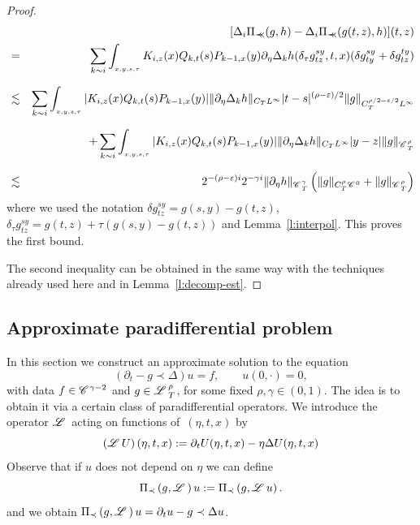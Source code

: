 \documentclass[11pt,reqno]{amsart}
\newcommand{\assign}{:=}
\newcommand{\precprec}{\prec\!\!\!\prec}
\newcommand{\CC}{\mathscr{C} \hspace{.1em}}
\newcommand{\LL}{\mathscr{L} \hspace{.2em}}
\begin{document}
\begin{proof}
  
  \begin{eqnarray*}
    &  & [\Delta_i \Pi_{\precprec} (g, h) - \Delta_i \Pi_{\precprec} (g (t,
    z), h)] (t, z)\\
    & = & \sum_{\underset{}{k \sim i}} \int_{_{x, y, s, \tau}} K_{i, z} (x)
    Q_{k, t} (s) P_{k - 1, x} (y) \partial_{\eta} \Delta_k h (\delta_{\tau}
    g^{s y}_{t z}, t, x) (\delta g^{s y}_{t y} + \delta g^{t y}_{t z})\\
    & \lesssim & \sum_{\underset{}{k \sim i}} \int_{_{x, y, s, \tau}} | K_{i,
    z} (x) Q_{k, t} (s) P_{k - 1, x} (y) | \| \partial_{\eta} \Delta_k h
    \|_{C_T L^{\infty}} | t - s |^{(\rho - \varepsilon) / 2} \| g \|_{C^{\rho
    / 2 - \varepsilon / 2}_T L^{\infty}}\\
    &  & + \sum_{\underset{}{k \sim i}} \int_{_{x, y, s, \tau}} | K_{i, z}
    (x) Q_{k, t} (s) P_{k - 1, x} (y) | \| \partial_{\eta} \Delta_k h \|_{C_T
    L^{\infty}} | y - z | \| g \|_{\CC^{\rho}_T}\\
    & \lesssim & 2^{- (\rho - \varepsilon) i} 2^{- \gamma i} \|
    \partial_{\eta} h \|_{\CC^{\gamma}_T} \left( \| g \|_{C^{\rho}_T \CC^0} +
    \| g \|_{\CC^{\rho}_T} \right)
  \end{eqnarray*}
  where we used the notation $\delta g^{s y}_{t z} = g (s, y) - g (t, z)$,
  $\delta_{\tau} g^{s y}_{t z} = g (t, z) + \tau (g (s, y) - g (t, z))$ and
  Lemma~\ref{l:interpol}. This proves the first bound.
  
  The second inequality can be obtained in the same way with the techniques
  already used here and in Lemma~\ref{l:decomp-est}.
\end{proof}

\subsection{Approximate paradifferential problem}\label{s:approx-paradiff}

In this section we construct an approximate solution to the equation
\begin{equation}
  (\partial_t - g \prec \Delta) u = f, \qquad u (0, \cdot) = 0,
  \label{e:paradiff}
\end{equation}
with data $f \in \CC^{\gamma - 2}$ and $g \in \LL^{\rho}_T$, for some fixed
$\rho, \gamma \in (0, 1)$. The idea is to obtain it via a certain class of
paradifferential operators. We introduce the operator $\LL$ acting on
functions of~$(\eta, t, x)$ by
\begin{equation}
  \left( \LL U \right) (\eta, t, x) \assign \partial_t U (\eta, t, x) - \eta
  \Delta U (\eta, t, x) \label{e:def-Loper}
\end{equation}
Observe that if $u$ does not depend on $\eta$ we can define
\begin{equation}
  \Pi_{\prec} \left( g, \LL \right) u \assign \Pi_{\prec} \left( g, \LL u
  \right) . \label{e:paradiff-oper}
\end{equation}
and we obtain $\Pi_{\prec} \left( g, \LL \right) u = \partial_t u - g \prec
\Delta u$.
\end{document}
